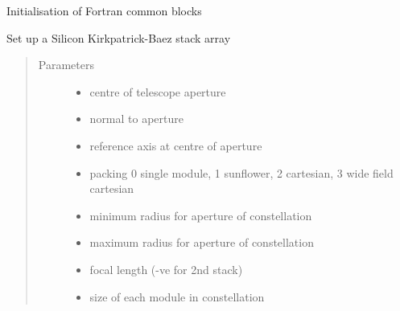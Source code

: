 \documentclass[letterpaper,10pt,english]{sphinxmanual}
\begin{document}

\begin{fulllineitems}
\label{\detokenize{xsrt_functions:xsrt.init}}
Initialisation of Fortran common blocks

\end{fulllineitems}


\begin{fulllineitems}
\label{\detokenize{xsrt_functions:xsrt.kbs}}
Set up a Silicon Kirkpatrick-Baez stack array
\begin{quote}\begin{description}
\item[{Parameters}] \leavevmode\begin{itemize}
\item {} 
 \textendash{} centre of telescope aperture

\item {} 
 \textendash{} normal to aperture

\item {} 
 \textendash{} reference axis at centre of aperture

\item {} 
 \textendash{} packing 0 single module, 1 sunflower, 2 cartesian, 3 wide
field cartesian

\item {} 
 \textendash{} minimum radius for aperture of constellation

\item {} 
 \textendash{} maximum radius for aperture of constellation

\item {} 
 \textendash{} focal length (-ve for 2nd stack)

\item {} 
 \textendash{} size of each module in constellation


\end{itemize}
\end{description}
\end{quote}
\end{fulllineitems}
\end{document}
